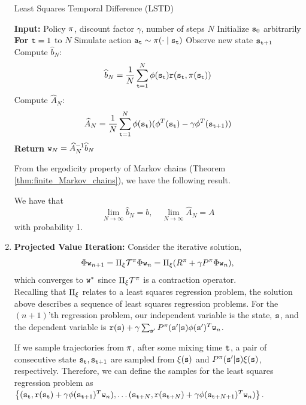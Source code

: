 \begin{enumerate}
\begin{algorithm}[H]
\caption{Least Squares Temporal Difference (LSTD)}
\begin{algorithmic}[1]
\State \textbf{Input:} Policy $\pi$, discount factor $\gamma$, number of steps $N$
\State Initialize ${\tt s}_0$ arbitrarily
\State \textbf{For} {${\tt t} = 1$ to $N$}
    \State \quad Simulate action ${\tt a}_{\tt t} \sim \pi(\cdot \mid {\tt s}_{\tt t})$
    \State \quad Observe new state ${\tt s}_{{\tt t}+1}$
\State Compute $\widehat{b}_N$:
\[
\widehat{b}_N = \frac{1}{N} \sum_{{\tt t}=1}^N \phi({\tt s}_{\tt t}) {\tt r}({\tt s}_{\tt t}, \pi({\tt s}_{\tt t}))
\]
\State Compute $\widehat{A}_N$:
\[
\widehat{A}_N = \frac{1}{N} \sum_{{\tt t}=1}^N \phi({\tt s}_{\tt t})(\phi^T({\tt s}_{\tt t}) - \gamma \phi^T({\tt s}_{{\tt t}+1}))
\]
\State \textbf{Return} ${\tt w}_N = \widehat{A}_N^{-1}\widehat{b}_N$
\end{algorithmic}
\end{algorithm}

From the ergodicity property of Markov chains (Theorem \ref{thm:finite_Markov_chains}), we have the following result.
\begin{proposition}
We have that 
\begin{equation*}
    \lim_{N\to \infty} \widehat{b}_N = b, \quad \lim_{N\to \infty} \widehat{A}_N = A
\end{equation*}
with probability 1.
\end{proposition}

\item \textbf{Projected Value Iteration:}
Consider the iterative solution,
$$\Phi {\tt w}_{n+1} = \Pi_\xi \mathcal{T}^\pi \Phi {\tt w}_n = \Pi_\xi(R^\pi+\gamma P^\pi \Phi {\tt w}_n),$$
which converges to ${\tt w}^*$ since $\Pi_\xi \mathcal{T}^\pi$ is a contraction operator.\\

Recalling that $\Pi_\xi$ relates to a least squares regression problem, the solution above describes a sequence of least squares regression problems. For the $(n+1)$'th regression problem, our independent variable is the state, ${\tt s}$, and the dependent variable is ${\tt r}({\tt s}) +\gamma \sum_{{\tt s}'}P^\pi({\tt s}'|{\tt s}) \phi({\tt s}')^T {\tt w}_n$.

If we sample trajectories from $\pi$, after some mixing time ${\tt t}$, a pair of consecutive state ${\tt s}_{\tt t}, {\tt s}_{{\tt t}+1}$ are sampled from $\xi({\tt s})$ and $P^\pi({\tt s}'|{\tt s})\xi({\tt s})$, respectively. Therefore, we can define the samples for the least squares regression problem as $\left\{({\tt s}_{\tt t}, {\tt r}({\tt s}_{\tt t}) +\gamma \phi({\tt s}_{{\tt t}+1})^T {\tt w}_n), \dots  ({\tt s}_{{\tt t}+N}, {\tt r}({\tt s}_{{\tt t}+N}) +\gamma \phi({\tt s}_{{\tt t}+N+1})^T {\tt w}_n)\right\}$.


\end{enumerate}
